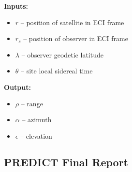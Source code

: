 \documentclass[11pt, reqno]{article}    %
\begin{document}
\noindent \textbf{Inputs: }
\begin{itemize}
    \item \(r \) --  position of satellite in ECI frame
    \item \( r_s \) -- position of observer in ECI frame
    \item \( \lambda \) -- observer geodetic latitude
    \item \( \theta \) -- site local sidereal time
\end{itemize}

\noindent \textbf{Output: }
\begin{itemize}
    \item \( \rho \) -- range
    \item \( \alpha \) -- azimuth
    \item \( \epsilon \) -- elevation
\end{itemize}

\subsection*{PREDICT Final Report}
\end{document}
